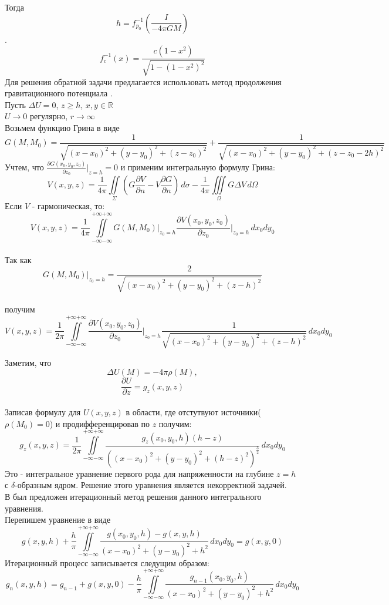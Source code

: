\documentclass[12pt]{article}
\begin{document}
Тогда \[h = f_{p_0}^{-1}\left({\frac{I}{-4{\pi}GM}} \right)\].
\[f_c^{-1}(x)={\frac{c(1-x^2)}{\sqrt{1-(1-x^2)^2}}}\]
\newline
Для решения обратной задачи предлагается использовать метод продолжения гравитационного потенциала \cite{dmitriev2012iterative1786867}.\\
\newline
Пусть ${\Delta}U=0$, $z{\geqslant}h$,
 $x,y {\in} \mathbb{ R}$\\
	$U{\longrightarrow}0$ регулярно, 
$r{\longrightarrow}{\infty}$\\
Возьмем функцию Грина в виде \[G(M,M_0)=\frac{1}{\sqrt{(x-x_0)^2+(y-y_0)^2+(z-z_0)^2}}+\frac{1}{\sqrt{(x-x_0)^2+(y-y_0)^2+(z-z_0-2h)^2}}\]
Учтем, что $\displaystyle\frac{{\partial}G(x_0,y_0,z_0)}{{\partial}z_0}{\Bigr|_{{z}=h}}=0$ и применим интегральную формулу Грина:\\
\[V(x,y,z)=\frac{1}{4\pi}\iint\limits_{\Sigma}\left({G\frac{{\partial}V}{{\partial}n} - V\frac{{\partial}G}{{\partial}n}}\right)\,d{\sigma} - \frac{1}{4\pi}\iiint\limits_{\Omega}G{\Delta}V\,d{\Omega}\]
Если $V$ - гармоническая, то:
\[V(x,y,z)=\frac{1}{4\pi}\iint\limits_{{-\infty}{-\infty}}^{{+\infty}{+\infty}}G(M,M_0){\Bigr|_{{z_0}=h}}\frac{{\partial}V(x_0,y_0,z_0)}{{\partial}z_0}{\Bigr|_{{z_0}=h}}\,dx_0dy_0\]\\

Так как $$G(M,M_0){\Bigr|_{{z_0}=h}}=\frac{2}{\sqrt{(x-x_0)^2+(y-y_0)^2+(z-h)^2}}$$ \\

получим \\
\[V(x,y,z)=\frac{1}{2\pi}\iint\limits_{{-\infty}{-\infty}}^{{+\infty}{+\infty}}\frac{{\partial}V(x_0,y_0,z_0)}{{\partial}z_0}{\Bigr|_{{z_0}=h}\frac{1}{\sqrt{(x-x_0)^2+(y-y_0)^2+(z-h)^2}}}\,dx_0dy_0\]

Заметим, что \[{\Delta}U(M)=-4{\pi}{\rho}(M),\] 
 \[\frac{{\partial}U}{{\partial}z}=g_z(x,y,z)\] \\
Записав формулу для $U(x,y,z)$ в области, где отстутвуют источники($\rho(M_0)=0$) и продифференцировав по $z$ получим:
\[g_z(x,y,z)=\frac{1}{2\pi}\iint\limits_{{-\infty}{-\infty}}^{{+\infty}{+\infty}}\frac{g_z(x_0,y_0,h)(h-z)}{((x-x_0)^2+(y-y_0)^2+(h-z)^2)^{\frac{3}{2}}}\,dx_0dy_0\]
Это - интегральное уравнение первого рода для напряженности на глубине $z=h$ с $\delta$-образным ядром. Решение этого уравнения является некорректной задачей.\\
В \cite{dmitriev2012iterative1786867} был предложен итерационный метод решения данного интегрального уравнения.\\
Перепишем уравнение в  виде \[g(x,y,h)+\frac{h}{\pi}\iint\limits_{{-\infty}{-\infty}}^{{+\infty}{+\infty}}\frac{g(x_0,y_0,h)-g(x,y,h)}{(x-x_0)^2+(y-y_0)^2+h^2} \,dx_0dy_0=g(x,y,0)\]
Итерационный процесс записывается следущим образом:
\[g_n(x,y,h)=g_{n-1}+g(x,y,0)-\frac{h}{\pi}\iint\limits_{{-\infty}{-\infty}}^{{+\infty}{+\infty}}\frac{g_{n-1}(x_0,y_0,h)}{(x-x_0)^2+(y-y_0)^2+h^2} \,dx_0dy_0\]
\end{document}
